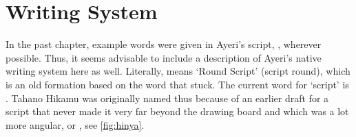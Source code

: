 
\chapter{Writing System}

In the past chapter, example words were given in Ayeri's script, , wherever possible. Thus, it seems advisable to include a 
description of Ayeri's native writing system here as well. Literally, 
 means `Round Script' (script round), which is 
an old formation based on the word  that  stuck. The 
current word for `script' is . Tahano Hikamu was 
originally named thus because of an earlier draft for a script that never made 
it very far beyond the drawing board and which was a lot more angular, or 
, see \autoref{fig:hinya}.

